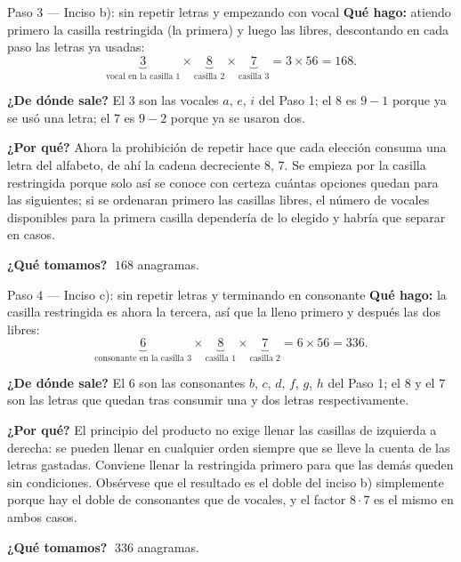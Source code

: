 \documentclass[11pt]{article}
\begin{document}
\begin{paso}{Paso 3 --- Inciso b): sin repetir letras y empezando con vocal}
\textbf{Qué hago:} atiendo primero la casilla restringida (la primera) y luego las libres, descontando en
cada paso las letras ya usadas:
\[
\underbrace{3}_{\text{vocal en la casilla 1}}\times\underbrace{8}_{\text{casilla 2}}\times\underbrace{7}_{\text{casilla 3}}
=3\times56=168 .
\]

\textbf{¿De dónde sale?} El $3$ son las vocales $a$, $e$, $i$ del Paso 1; el $8$ es $9-1$ porque ya se usó
una letra; el $7$ es $9-2$ porque ya se usaron dos.

\textbf{¿Por qué?} Ahora la prohibición de repetir hace que cada elección consuma una letra del alfabeto,
de ahí la cadena decreciente $8$, $7$. Se empieza por la casilla restringida porque solo así se conoce con
certeza cuántas opciones quedan para las siguientes; si se ordenaran primero las casillas libres, el número
de vocales disponibles para la primera casilla dependería de lo elegido y habría que separar en casos.

\textbf{¿Qué tomamos?} $\;168$ anagramas.
\end{paso}

\begin{paso}{Paso 4 --- Inciso c): sin repetir letras y terminando en consonante}
\textbf{Qué hago:} la casilla restringida es ahora la tercera, así que la lleno primero y después las dos
libres:
\[
\underbrace{6}_{\text{consonante en la casilla 3}}\times\underbrace{8}_{\text{casilla 1}}\times\underbrace{7}_{\text{casilla 2}}
=6\times56=336 .
\]

\textbf{¿De dónde sale?} El $6$ son las consonantes $b$, $c$, $d$, $f$, $g$, $h$ del Paso 1; el $8$ y el
$7$ son las letras que quedan tras consumir una y dos letras respectivamente.

\textbf{¿Por qué?} El principio del producto no exige llenar las casillas de izquierda a derecha: se pueden
llenar en cualquier orden siempre que se lleve la cuenta de las letras gastadas. Conviene llenar la
restringida primero para que las demás queden sin condiciones. Obsérvese que el resultado es el doble del
inciso b) simplemente porque hay el doble de consonantes que de vocales, y el factor $8\cdot7$ es el mismo
en ambos casos.

\textbf{¿Qué tomamos?} $\;336$ anagramas.
\end{paso}
\end{document}
